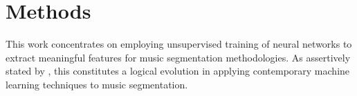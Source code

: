 \chapter{Methods}

This work concentrates on employing unsupervised training of neural networks to extract meaningful features for music segmentation methodologies. As assertively stated by \cite{deepfeaturesegment}, this constitutes a logical evolution in applying contemporary machine learning techniques to music segmentation.




\newpage



